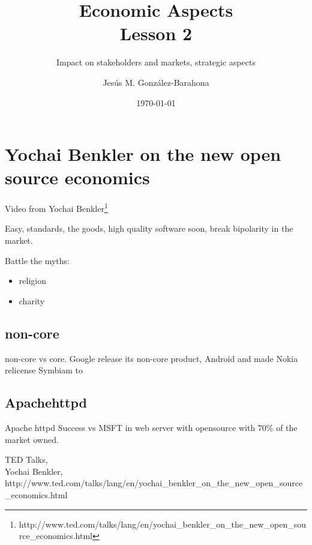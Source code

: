 \documentclass[11pt]{scrartcl}
\title{\textbf{Economic Aspects\\
                Lesson 2}}
\subtitle{Impact on stakeholders and markets, strategic aspects}
\author{Jesús M. González-Barahona}
\date{\today}
\begin{document}
\maketitle

\section{Yochai Benkler on the new open source economics}

Video from Yochai Benkler\footnote{http://www.ted.com/talks/lang/en/yochai\_benkler\_on\_the\_new\_open\_source\_economics.html}

Easy, standards, the goods, high quality software soon, break bipolarity in the market.

Battle the myths:
\begin{itemize}
    \item religion
    \item charity
\end{itemize}

\subsection{non-core}

non-core vs core. Google release its non-core product, Android and made Nokia relicense Symbiam to

\subsection{Apachehttpd}

Apache httpd Success vs MSFT in web server with opensource with 70\% of the market owned.

\begin{thebibliography}{9}

    TED Talks,\\
    Yochai Benkler,\\
    http://www.ted.com/talks/lang/en/yochai\_benkler\_on\_the\_new\_open\_source\_economics.html
\end{thebibliography}
\end{document}
